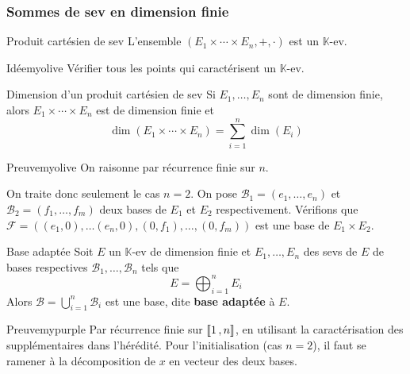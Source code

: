     \subsubsection{Sommes de sev en dimension finie}

    \begin{prop}{Produit cartésien de sev}{}
        L’ensemble $(E_1 \times \cdots \times E_n, +, \cdotp)$ est un $\mathbb{K}$-ev.
    \end{prop}

    \begin{demo}{Idée}{myolive}
        Vérifier tous les points qui caractérisent un $\mathbb{K}$-ev.
    \end{demo}

    \begin{prop}{Dimension d’un produit cartésien de sev}{}
        Si $E_1, \ldots, E_n$ sont de dimension finie, alors $E_1 \times \cdots \times E_n$ est de dimension finie et 
        \[ \dim(E_1 \times \cdots \times E_n) = \sum_{i=1}^{n} \dim(E_i) \]
    \end{prop}

    \begin{demo}{Preuve}{myolive}
        On raisonne par récurrence finie sur $n$.

        On traite donc seulement le cas $n = 2$. On pose $\mathcal{B}_1 = (e_1,\ldots, e_n)$ et $\mathcal{B}_2 = (f_1, \ldots, f_m)$ deux bases de $E_1$ et $E_2$ respectivement. Vérifions que $\mathcal{F} = \left((e_1,0), \ldots (e_n,0), (0,f_1), \ldots, (0,f_m)\right)$ est une base de $E_1 \times E_2$.
    \end{demo}

    \begin{defitheo}{Base adaptée}{}
        Soit $E$ un $\mathbb{K}$-ev de dimension finie et $E_1,\ldots,E_n$ des sevs de $E$ de bases respectives $\mathcal{B}_1, \ldots, \mathcal{B}_n$ tels que 
        \[ E = \bigoplus_{i = 1}^n E_i \]   
        Alors $\mathcal{B} = \bigcup_{i = 1}^n \mathcal{B}_i$ est une base, dite \textbf{base adaptée} à $E$.
    \end{defitheo} 

    \begin{demo}{Preuve}{mypurple}
        Par récurrence finie sur $\left\llbracket 1 \, , n \right\rrbracket$, en utilisant la caractérisation des supplémentaires dans l’hérédité. Pour l’initialisation (cas $n =2$), il faut se ramener à la décomposition de $x$ en vecteur des deux bases.
    \end{demo}

